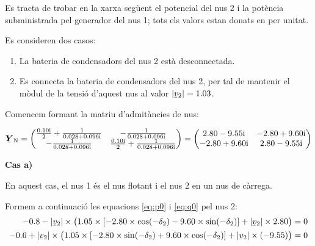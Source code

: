 \begin{exemple}\label{ex:ControlTensCond}
	\addcontentsxms{\ControlTensCond}
    Es tracta de trobar en la xarxa següent el potencial del nus 2 i la
    potència subministrada pel generador del nus 1; tots els valors
    estan donats en per unitat.

    \begin{center}
        
    \end{center}

    Es consideren dos casos:

    \begin{enumerate}
       \renewcommand{\labelenumi}{\alph{enumi})}
       \item La bateria de condensadors del nus 2 està desconnectada.
       \item Es connecta la bateria de condensadors del nus 2, per tal de mantenir el mòdul de
       la tensió d'aquest nus al valor $|\cmplx{v}_2|=\num{1,03}$.
    \end{enumerate}

    Comencem formant la matriu d'admitàncies de nus:

    \[
    \mcmplx{Y}\ped{N} = \begin{pmatrix}
      \frac{\complexnum{j 0,10}}{2} + \frac{1}{\complexnum{0,028+j0,096}} & -\frac{1}{\complexnum{0,028+j0,096}} \\
      -\frac{1}{\complexnum{0,028+j0,096}} & \frac{\complexnum{j 0,10}}{2} + \frac{1}{\complexnum{0,028+j0,096}} \\
    \end{pmatrix} =
    \begin{pmatrix}
      \complexnum{2,80 -j9,55} & \complexnum{-2,80 +j9,60} \\
      \complexnum{-2,80 +j9,60} & \complexnum{2,80 -j9,55} \\
    \end{pmatrix}
    \]

    \textbf{Cas a)}

     En aquest cas, el nus 1 és el nus flotant i el nus 2 en un nus
    de càrrega.

    Formem a continuació les equacions \eqref{eq:p0} i \eqref{eq:q0} pel
    nus 2:
    \begin{align*}
    \num{-0,8} - |\cmplx{v}_2| \times \bigl( \num{1,05}\times [\num{-2,80}\times \cos(-\delta_2) - \num{9,60} \times
    \sin( -\delta_2)]  + |\cmplx{v}_2| \times \num{2,80} \bigr) &= 0 \\
    -\num{0,6} + |\cmplx{v}_2| \times\bigl( \num{1,05} \times[-\num{2,80}\times\sin(-\delta_2) +
    \num{9,60}\times\cos( -\delta_2)]  + |\cmplx{v}_2|\times (-\num{9,55}) \bigr) &= 0
    \end{align*}


\end{exemple}
